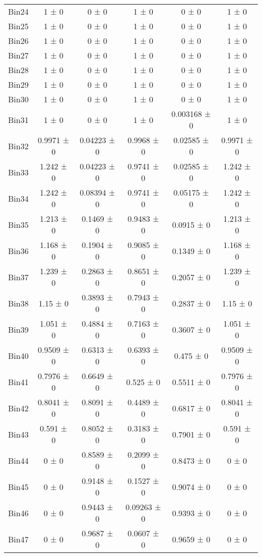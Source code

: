 \begin{tabular}{@{\extracolsep{4pt}}lccccc@{}}
     Bin24 & 1 ± 0 & 0 ± 0 & 1 ± 0 & 0 ± 0 & 1 ± 0 \\ 
     Bin25 & 1 ± 0 & 0 ± 0 & 1 ± 0 & 0 ± 0 & 1 ± 0 \\ 
     Bin26 & 1 ± 0 & 0 ± 0 & 1 ± 0 & 0 ± 0 & 1 ± 0 \\ 
     Bin27 & 1 ± 0 & 0 ± 0 & 1 ± 0 & 0 ± 0 & 1 ± 0 \\ 
     Bin28 & 1 ± 0 & 0 ± 0 & 1 ± 0 & 0 ± 0 & 1 ± 0 \\ 
     Bin29 & 1 ± 0 & 0 ± 0 & 1 ± 0 & 0 ± 0 & 1 ± 0 \\ 
     Bin30 & 1 ± 0 & 0 ± 0 & 1 ± 0 & 0 ± 0 & 1 ± 0 \\ 
     Bin31 & 1 ± 0 & 0 ± 0 & 1 ± 0 & 0.003168 ± 0 & 1 ± 0 \\ 
     Bin32 & 0.9971 ± 0 & 0.04223 ± 0 & 0.9968 ± 0 & 0.02585 ± 0 & 0.9971 ± 0 \\ 
     Bin33 & 1.242 ± 0 & 0.04223 ± 0 & 0.9741 ± 0 & 0.02585 ± 0 & 1.242 ± 0 \\ 
     Bin34 & 1.242 ± 0 & 0.08394 ± 0 & 0.9741 ± 0 & 0.05175 ± 0 & 1.242 ± 0 \\ 
     Bin35 & 1.213 ± 0 & 0.1469 ± 0 & 0.9483 ± 0 & 0.0915 ± 0 & 1.213 ± 0 \\ 
     Bin36 & 1.168 ± 0 & 0.1904 ± 0 & 0.9085 ± 0 & 0.1349 ± 0 & 1.168 ± 0 \\ 
     Bin37 & 1.239 ± 0 & 0.2863 ± 0 & 0.8651 ± 0 & 0.2057 ± 0 & 1.239 ± 0 \\ 
     Bin38 & 1.15 ± 0 & 0.3893 ± 0 & 0.7943 ± 0 & 0.2837 ± 0 & 1.15 ± 0 \\ 
     Bin39 & 1.051 ± 0 & 0.4884 ± 0 & 0.7163 ± 0 & 0.3607 ± 0 & 1.051 ± 0 \\ 
     Bin40 & 0.9509 ± 0 & 0.6313 ± 0 & 0.6393 ± 0 & 0.475 ± 0 & 0.9509 ± 0 \\ 
     Bin41 & 0.7976 ± 0 & 0.6649 ± 0 & 0.525 ± 0 & 0.5511 ± 0 & 0.7976 ± 0 \\ 
     Bin42 & 0.8041 ± 0 & 0.8091 ± 0 & 0.4489 ± 0 & 0.6817 ± 0 & 0.8041 ± 0 \\ 
     Bin43 & 0.591 ± 0 & 0.8052 ± 0 & 0.3183 ± 0 & 0.7901 ± 0 & 0.591 ± 0 \\ 
     Bin44 & 0 ± 0 & 0.8589 ± 0 & 0.2099 ± 0 & 0.8473 ± 0 & 0 ± 0 \\ 
     Bin45 & 0 ± 0 & 0.9148 ± 0 & 0.1527 ± 0 & 0.9074 ± 0 & 0 ± 0 \\ 
     Bin46 & 0 ± 0 & 0.9443 ± 0 & 0.09263 ± 0 & 0.9393 ± 0 & 0 ± 0 \\ 
     Bin47 & 0 ± 0 & 0.9687 ± 0 & 0.0607 ± 0 & 0.9659 ± 0 & 0 ± 0 \\ 

\end{tabular}
